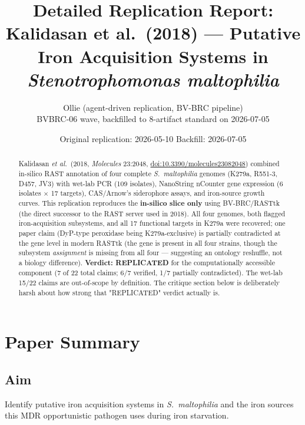 \documentclass[10pt,a4paper]{article}
\title{Detailed Replication Report:\\
Kalidasan et al.\ (2018) --- Putative Iron Acquisition Systems in
\textit{Stenotrophomonas maltophilia}}
\author{Ollie (agent-driven replication, BV-BRC pipeline)\\
BVBRC-06 wave, backfilled to 8-artifact standard on 2026-07-05}
\date{Original replication: 2026-05-10 \quad Backfill: 2026-07-05}
\begin{document}
\maketitle

\begin{abstract}
\noindent Kalidasan \textit{et al.}\ (2018, \textit{Molecules} 23:2048,
\href{https://doi.org/10.3390/molecules23082048}{doi:10.3390/molecules23082048})
combined in-silico RAST annotation of four complete \textit{S.\ maltophilia}
genomes (K279a, R551-3, D457, JV3) with wet-lab PCR (109 isolates), NanoString
nCounter gene expression (6 isolates $\times$ 17 targets), CAS/Arnow's
siderophore assays, and iron-source growth curves. This replication reproduces
the \textbf{in-silico slice only} using BV-BRC/RASTtk (the direct successor to
the RAST server used in 2018). All four genomes, both flagged iron-acquisition
subsystems, and all 17 functional targets in K279a were recovered; one paper
claim (DyP-type peroxidase being K279a-exclusive) is partially contradicted at
the gene level in modern RASTtk (the gene is present in all four strains,
though the subsystem \textit{assignment} is missing from all four --- suggesting
an ontology reshuffle, not a biology difference). \textbf{Verdict: REPLICATED}
for the computationally accessible component (7 of 22 total claims;
6/7 verified, 1/7 partially contradicted). The wet-lab 15/22 claims are
out-of-scope by definition. The critique section below is deliberately harsh
about how strong that "REPLICATED" verdict actually is.
\end{abstract}

\section{Paper Summary}
\subsection{Aim}
Identify putative iron acquisition systems in \textit{S.\ maltophilia} and the
iron sources this MDR opportunistic pathogen uses during iron starvation.
\end{document}
